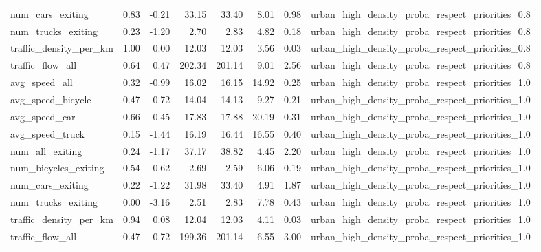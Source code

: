 \begin{table}[ht]
\begin{tabular}{lrrrrrrl}
  num\_cars\_exiting & 0.83 & -0.21 & 33.15 & 33.40 & 8.01 & 0.98 & urban\_high\_density\_proba\_respect\_priorities\_0.8 \\ 
  num\_trucks\_exiting & 0.23 & -1.20 & 2.70 & 2.83 & 4.82 & 0.18 & urban\_high\_density\_proba\_respect\_priorities\_0.8 \\ 
  traffic\_density\_per\_km & 1.00 & 0.00 & 12.03 & 12.03 & 3.56 & 0.03 & urban\_high\_density\_proba\_respect\_priorities\_0.8 \\ 
  traffic\_flow\_all & 0.64 & 0.47 & 202.34 & 201.14 & 9.01 & 2.56 & urban\_high\_density\_proba\_respect\_priorities\_0.8 \\ 
  avg\_speed\_all & 0.32 & -0.99 & 16.02 & 16.15 & 14.92 & 0.25 & urban\_high\_density\_proba\_respect\_priorities\_1.0 \\ 
  avg\_speed\_bicycle & 0.47 & -0.72 & 14.04 & 14.13 & 9.27 & 0.21 & urban\_high\_density\_proba\_respect\_priorities\_1.0 \\ 
  avg\_speed\_car & 0.66 & -0.45 & 17.83 & 17.88 & 20.19 & 0.31 & urban\_high\_density\_proba\_respect\_priorities\_1.0 \\ 
  avg\_speed\_truck & 0.15 & -1.44 & 16.19 & 16.44 & 16.55 & 0.40 & urban\_high\_density\_proba\_respect\_priorities\_1.0 \\ 
  num\_all\_exiting & 0.24 & -1.17 & 37.17 & 38.82 & 4.45 & 2.20 & urban\_high\_density\_proba\_respect\_priorities\_1.0 \\ 
  num\_bicycles\_exiting & 0.54 & 0.62 & 2.69 & 2.59 & 6.06 & 0.19 & urban\_high\_density\_proba\_respect\_priorities\_1.0 \\ 
  num\_cars\_exiting & 0.22 & -1.22 & 31.98 & 33.40 & 4.91 & 1.87 & urban\_high\_density\_proba\_respect\_priorities\_1.0 \\ 
  num\_trucks\_exiting & 0.00 & -3.16 & 2.51 & 2.83 & 7.78 & 0.43 & urban\_high\_density\_proba\_respect\_priorities\_1.0 \\ 
  traffic\_density\_per\_km & 0.94 & 0.08 & 12.04 & 12.03 & 4.11 & 0.03 & urban\_high\_density\_proba\_respect\_priorities\_1.0 \\ 
  traffic\_flow\_all & 0.47 & -0.72 & 199.36 & 201.14 & 6.55 & 3.00 & urban\_high\_density\_proba\_respect\_priorities\_1.0 \\ 
   \hline
\end{tabular}
\end{table}
